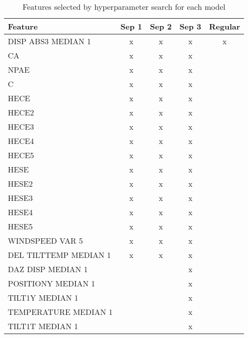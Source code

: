 
\begin{table}[htbp]
    \centering
    \caption{Features selected by hyperparameter search for each model}
    \label{tab:features}
    \begin{tabular}{|l|cccc|}
        \hline
        Feature & Sep 1 & Sep 2 & Sep 3 & Regular \\ \hline
        DISP ABS3 MEDIAN 1 & x & x & x & x \\ \hline
        CA & x & x & x & \\ \hline
        NPAE & x & x & x & \\ \hline
        C & x & x & x & \\ \hline
        HECE & x & x & x & \\ \hline
        HECE2 & x & x & x & \\ \hline
        HECE3 & x & x & x & \\ \hline
        HECE4 & x & x & x & \\ \hline
        HECE5 & x & x & x & \\ \hline
        HESE & x & x & x & \\ \hline
        HESE2 & x & x & x & \\ \hline
        HESE3 & x & x & x & \\ \hline
        HESE4 & x & x & x & \\ \hline
        HESE5 & x & x & x & \\ \hline
        WINDSPEED VAR 5 & x & x & x & \\ \hline
        DEL TILTTEMP MEDIAN 1 & x & x & x & \\ \hline
        DAZ DISP MEDIAN 1 & & & x & \\ \hline
        POSITIONY MEDIAN 1 & & & x & \\ \hline
        TILT1Y MEDIAN 1 & & & x & \\ \hline
        TEMPERATURE MEDIAN 1 & & & x & \\ \hline
        TILT1T MEDIAN 1 & & & x & \\ \hline
    \end{tabular}
\end{table}